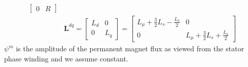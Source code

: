 \documentclass[12pt,a4paper]{scrartcl}
\begin{document}
\begin{onehalfspace}
\begin{mybox}
\begin{equation*}
\begin{aligned}
\begin{bmatrix}
				0 & R
			\end{bmatrix} \\[6pt]
			& \mathbf{L}^{dq} = 
			\begin{bmatrix} L_d &  0 \\
				0 & L_q
			\end{bmatrix} =
			\begin{bmatrix} L_\mu+\frac{3}{2}L_s-\frac{L_b}{2} &  0 \\
				0 & L_\mu+\frac{3}{2}L_s+\frac{L_b}{2}
			\end{bmatrix}
		\end{aligned} 
	\end{equation*}
	$\psi^m$ is the amplitude of the permanent magnet flux as viewed from the stator phase winding and we assume constant.
\end{mybox}


\end{onehalfspace}
\end{document}
